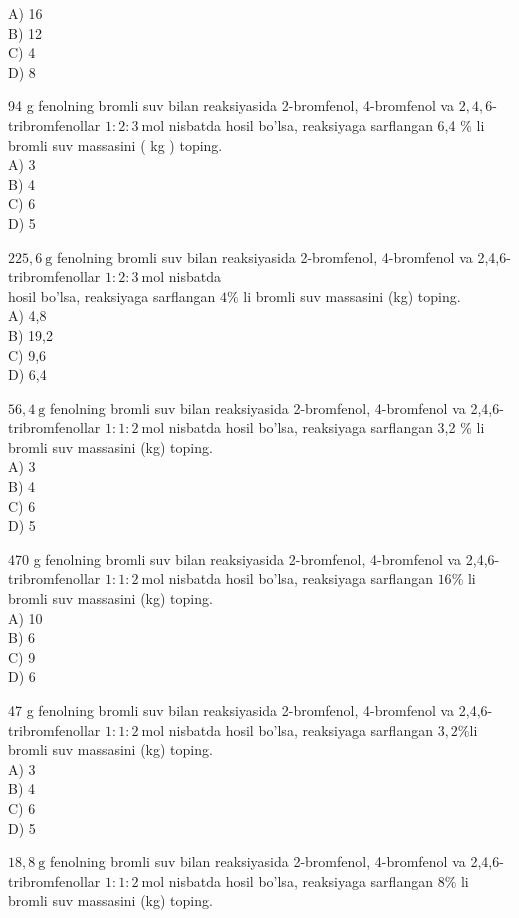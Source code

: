 A) 16\\
B) 12\\
C) 4\\
D) 8
  \item 94 g fenolning bromli suv bilan reaksiyasida 2-bromfenol, 4-bromfenol va $2,4,6$-tribromfenollar $1: 2: 3 \mathrm{~mol}$ nisbatda hosil bo'lsa, reaksiyaga sarflangan 6,4 \% li bromli suv massasini ( kg ) toping.\\
A) 3\\
B) 4\\
C) 6\\
D) 5
  \item $225,6 \mathrm{~g}$ fenolning bromli suv bilan reaksiyasida 2-bromfenol, 4-bromfenol va 2,4,6-tribromfenollar $1: 2: 3 \mathrm{~mol}$ nisbatda\\hosil bo'lsa, reaksiyaga sarflangan $4 \%$ li bromli suv massasini (kg) toping.\\
A) 4,8\\
B) 19,2\\
C) 9,6\\
D) 6,4
  \item $56,4 \mathrm{~g}$ fenolning bromli suv bilan reaksiyasida 2-bromfenol, 4-bromfenol va 2,4,6-tribromfenollar $1: 1: 2 \mathrm{~mol}$ nisbatda hosil bo'lsa, reaksiyaga sarflangan 3,2 \% li bromli suv massasini (kg) toping.\\
A) 3\\
B) 4\\
C) 6\\
D) 5
  \item 470 g fenolning bromli suv bilan reaksiyasida 2-bromfenol, 4-bromfenol va 2,4,6-tribromfenollar $1: 1: 2 \mathrm{~mol}$ nisbatda hosil bo'lsa, reaksiyaga sarflangan $16 \%$ li bromli suv massasini (kg) toping.\\
A) 10\\
B) 6\\
C) 9\\
D) 6
  \item 47 g fenolning bromli suv bilan reaksiyasida 2-bromfenol, 4-bromfenol va 2,4,6-tribromfenollar $1: 1: 2 \mathrm{~mol}$ nisbatda hosil bo'lsa, reaksiyaga sarflangan $3,2 \% \mathrm{li}$ bromli suv massasini (kg) toping.\\
A) 3\\
B) 4\\
C) 6\\
D) 5
  \item $18,8 \mathrm{~g}$ fenolning bromli suv bilan reaksiyasida 2-bromfenol, 4-bromfenol va 2,4,6-tribromfenollar $1: 1: 2 \mathrm{~mol}$ nisbatda hosil bo'lsa, reaksiyaga sarflangan $8 \%$ li bromli suv massasini (kg) toping.\\
